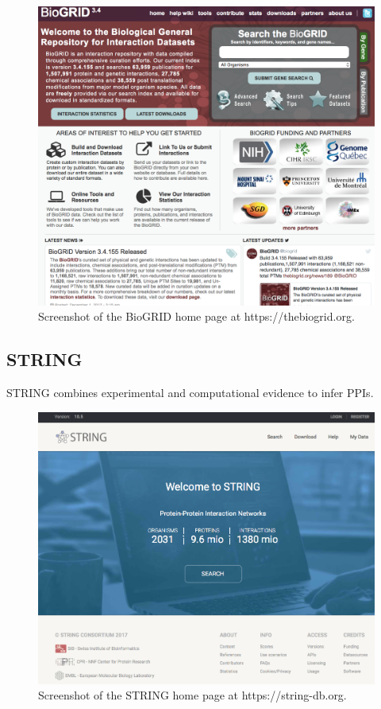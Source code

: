 \documentclass[]{book}
\theoremstyle{definition}
\theoremstyle{definition}
\theoremstyle{definition}
\theoremstyle{remark}
\begin{document}
\begin{figure}
\includegraphics[width=14.17in]{pic/biogrid_web} \caption{Screenshot of the BioGRID home page at https://thebiogrid.org.}\label{fig:biogrid-web}
\end{figure}

\subsection{STRING}\label{string}

STRING combines experimental and computational evidence to infer PPIs.

\begin{figure}
\includegraphics[width=14.21in]{pic/string_web} \caption{Screenshot of the STRING home page at https://string-db.org.}\label{fig:string-web}
\end{figure}
\end{document}
